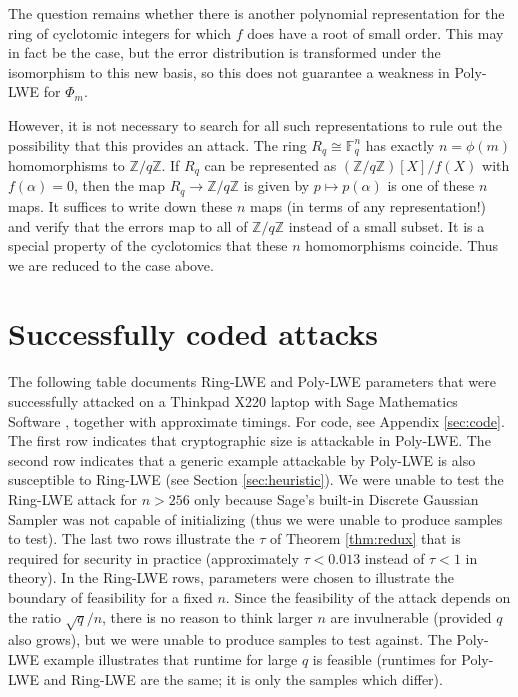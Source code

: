 \documentclass{llncs}
\newcommand{\FF}{\mathbb{F}}
\newcommand{\ZZ}{\mathbb{Z}}
\newcommand{\<}{\langle}
\renewcommand{\>}{\rangle}
\begin{document}
The question remains whether there is another polynomial representation for the ring of cyclotomic integers for which $f$ does have a root of small order.  This may in fact be the case, but the error distribution is transformed under the isomorphism to this new basis, so this does not guarantee a weakness in Poly-LWE for $\Phi_m$.

However, it is not necessary to search for all such representations to rule out the possibility that this provides an attack. The ring $R_q \cong \FF_q^n$ has exactly $n = \phi(m)$ homomorphisms to $\ZZ/q\ZZ$.  If $R_q$ can be represented as $(\ZZ/q\ZZ)[X]/f(X)$ with $f(\alpha)=0$, then the map $R_q \rightarrow \ZZ/q\ZZ$ is given by $p \mapsto p(\alpha)$ is one of these $n$ maps.  It suffices to write down these $n$ maps (in terms of any representation!) and verify that the errors map to all of $\ZZ/q\ZZ$ instead of a small subset.  It is a special property of the cyclotomics that these $n$ homomorphisms coincide.  Thus we are reduced to the case above.


\section{Successfully coded attacks}
\label{sec:exampleattack}

The following table documents Ring-LWE and Poly-LWE parameters that were successfully attacked on a Thinkpad X220 laptop with Sage Mathematics Software \cite{S}, together with approximate timings.  For code, see Appendix \ref{sec:code}.  The first row indicates that cryptographic size is attackable in Poly-LWE.  The second row indicates that a generic example attackable by Poly-LWE is also susceptible to Ring-LWE (see Section \ref{sec:heuristic}).  We were unable to test the Ring-LWE attack for $n>256$ only because Sage's built-in Discrete Gaussian Sampler was not capable of initializing (thus we were unable to produce samples to test).  The last two rows illustrate the $\tau$ of Theorem \ref{thm:redux} that is required for security in practice (approximately $\tau < 0.013$ instead of $\tau < 1$ in theory).  In the Ring-LWE rows, parameters were chosen to illustrate the boundary of feasibility for a fixed $n$.  Since the feasibility of the attack depends on the ratio $\sqrt{q}/n$, there is no reason to think larger $n$ are invulnerable (provided $q$ also grows), but we were unable to produce samples to test against.  The Poly-LWE example illustrates that runtime for large $q$ is feasible (runtimes for Poly-LWE and Ring-LWE are the same; it is only the samples which differ).
\end{document}

